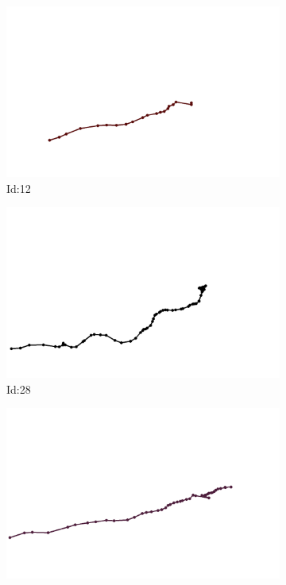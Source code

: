 \documentclass[12pt,twoside]{report}
\begin{document}
\begin{figure}
\centering
\begin{subfigure}[b]{0.20\textwidth}
\centering
\includegraphics[width=\textwidth]{../trajectories/12.png}
\caption{Id:12}
\end{subfigure}
\begin{subfigure}[b]{0.20\textwidth}
\centering
\includegraphics[width=\textwidth]{../trajectories/28.png}
\caption{Id:28}
\end{subfigure}
\begin{subfigure}[b]{0.20\textwidth}
\centering
\includegraphics[width=\textwidth]{../trajectories/29.png}

\end{subfigure}
\end{figure}
\end{document}
